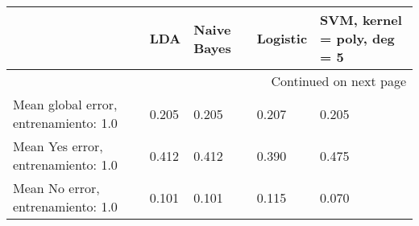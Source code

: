 \begin{longtable}{p{4cm}|p{1.5cm}|p{1.5cm}|p{1.5cm}|p{1.5cm}}
\toprule
{} &   LDA &  Naive Bayes &  Logistic &  SVM, kernel = poly, deg = 5 \\
\midrule
\endhead
\midrule
\multicolumn{5}{r}{{Continued on next page}} \\
\midrule
\endfoot

\bottomrule
\endlastfoot
Mean global error, entrenamiento: 1.0 & 0.205 &        0.205 &     0.207 &                        0.205 \\
Mean Yes error, entrenamiento: 1.0    & 0.412 &        0.412 &     0.390 &                        0.475 \\
Mean No error, entrenamiento: 1.0     & 0.101 &        0.101 &     0.115 &                        0.070 \\
\end{longtable}
